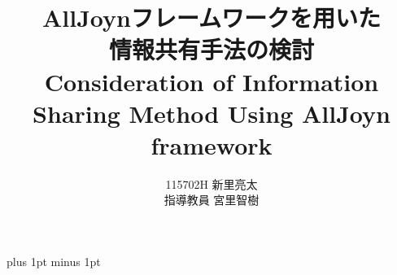 \documentclass[a4j,12pt]{jreport}
\title{AllJoynフレームワークを用いた\\情報共有手法の検討\\ \LARGE Consideration of Information Sharing Method Using AllJoyn framework}
\author{\LARGE 115702H 新里亮太 \\ 指導教員 宮里智樹 }
\begin{document}
\maketitle
\baselineskip 17pt plus 1pt minus 1pt

\setcounter{page}{0}

\tableofcontents	%
\listoffigures		%
\listoftables		%


















%
\end{document}
